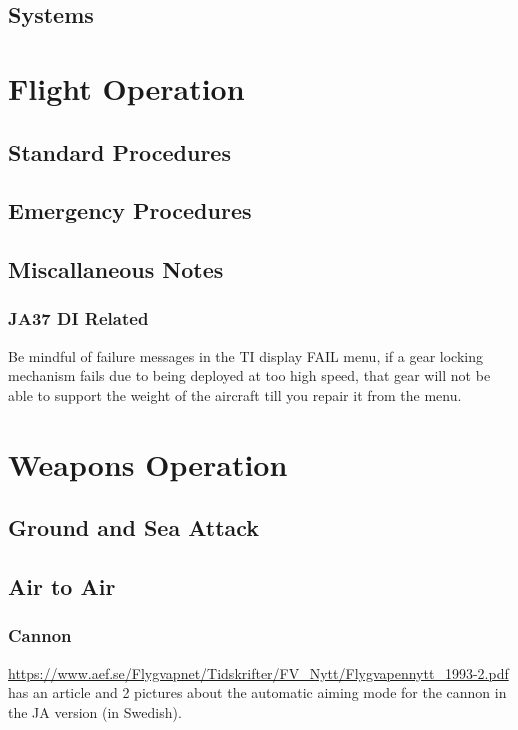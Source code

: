 \chapter{Systems}

\part{Flight Operation}
\chapter{Standard Procedures}
\chapter{Emergency Procedures}
\chapter{Miscallaneous Notes}
\section{JA37 DI Related}
Be mindful of failure messages in the TI display FAIL menu, if a gear locking mechanism fails due to being deployed at too high speed, that gear will not be able to support the weight of the aircraft till you repair it from the menu.

\part{Weapons Operation}
\chapter{Ground and Sea Attack}
\chapter{Air to Air}
\section{Cannon}
\url{https://www.aef.se/Flygvapnet/Tidskrifter/FV_Nytt/Flygvapennytt_1993-2.pdf} has an article and 2 pictures about the automatic aiming mode for the cannon in the JA version (in Swedish).



